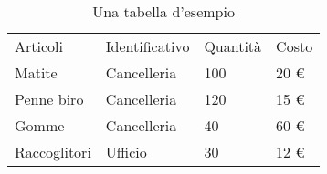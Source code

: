 \usepackage{eurosym} %
\begin{table}[H]
\centering
\begin{tabular}{llll}
Articoli      & Identificativo & Quantità & Costo \\
Matite        & Cancelleria    & 100      & 20 \euro{}\\
Penne biro    & Cancelleria    & 120      & 15 \euro{}\\
Gomme         & Cancelleria    & 40       & 60 \euro{}\\
Raccoglitori  & Ufficio        & 30       & 12 \euro{} 
\end{tabular}
\caption{Una tabella d'esempio}
\label{tabella:esempio}
\end{table}
